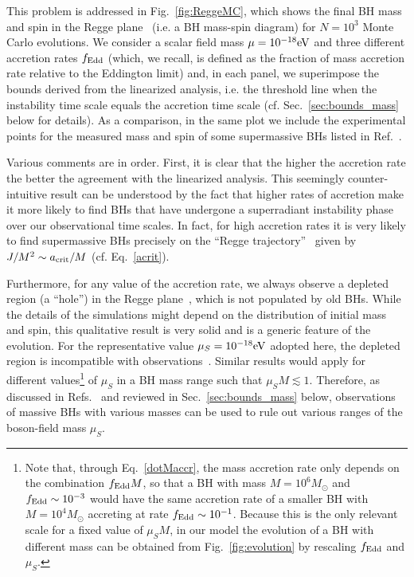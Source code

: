 \documentclass[11pt]{article}
\numberwithin{equation}{section} %
\begin{document}
This problem is addressed in Fig.~\ref{fig:ReggeMC}, which shows the final BH mass and spin in the Regge plane~\cite{Arvanitaki:2009fg,Arvanitaki:2010sy} (i.e. a BH mass-spin diagram) for $N=10^3$ Monte Carlo evolutions. We consider a scalar field mass $\mu=10^{-18}{\rm eV}$ and three different accretion rates $f_{\rm Edd}$ (which, we recall, is defined as the fraction of mass accretion rate relative to the Eddington limit) and, in each panel, we superimpose the bounds derived from the linearized analysis, i.e. the threshold line when the instability time scale equals the accretion time scale (cf. Sec.~\ref{sec:bounds_mass} below for details). As a comparison, in the same plot we include the experimental points for the measured mass and spin of some supermassive BHs listed in Ref.~\cite{Brenneman:2011wz}. 



Various comments are in order. First, it is clear that the higher the accretion rate the better the agreement with the linearized analysis. This seemingly counter-intuitive result can be understood by the fact that higher rates of accretion make it more likely to find BHs that have undergone a superradiant instability phase over our observational time scales. In fact, for high accretion rates it is very likely to find supermassive BHs precisely on the ``Regge trajectory''~\cite{Arvanitaki:2009fg,Arvanitaki:2010sy} given by $J/M^2\sim a_{\rm crit}/M$ (cf. Eq.~\eqref{acrit}).

Furthermore, for any value of the accretion rate, we always observe a depleted region (a ``hole'') in the Regge plane~\cite{Arvanitaki:2009fg,Arvanitaki:2010sy}, which is not populated by old BHs. While the details of the simulations might depend on the distribution of initial mass and spin, this qualitative result is very solid and is a generic feature of the evolution. For the representative value $\mu_S=10^{-18}{\rm eV}$ adopted here, the depleted region is incompatible with observations~\cite{Brenneman:2011wz}. Similar results would apply for different values\footnote{Note that, through Eq.~\eqref{dotMaccr}, the mass accretion rate only depends on the combination $f_{\rm Edd} M$, so that a BH with mass $M=10^6 M_\odot$ and $f_{\rm Edd}\sim10^{-3}$ would have the same accretion rate of a smaller BH with $M=10^{4} M_\odot$ accreting at rate $f_{\rm Edd}\sim10^{-1}$. Because this is the only relevant scale for a fixed value of $\mu_S M$, in our model the evolution of a BH with different mass can be obtained from Fig.~\ref{fig:evolution} by rescaling $f_{\rm Edd}$ and $\mu_S$.} of $\mu_S$ in a BH mass range such that $\mu_S M\lesssim1$. Therefore, as discussed in Refs.~\cite{Arvanitaki:2009fg,Arvanitaki:2010sy,Pani:2012vp,Brito:2013wya} and reviewed in Sec.~\ref{sec:bounds_mass} below, observations of massive BHs with various masses can be used to rule out various ranges of the boson-field mass $\mu_S$.
\end{document}

